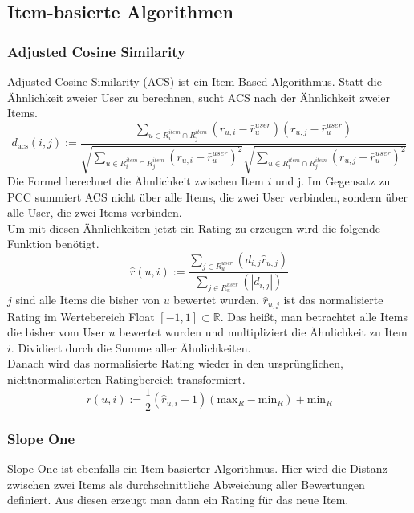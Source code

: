 \subsection{Item-basierte Algorithmen}
\subsubsection{Adjusted Cosine Similarity}\label{s.adjcos}
Adjusted Cosine Similarity (ACS) ist ein Item-Based-Algorithmus. Statt die Ähnlichkeit zweier User zu berechnen, sucht ACS nach der Ähnlichkeit zweier Items.
\begin{equation}
 d_{\mathrm{acs}}(i,j) := \dfrac{\sum\limits_{u\in R^{item}_{i} \cap R^{item}_{j}} (r_{u,i}-\bar{r}^{user}_{u})(r_{u,j}-\bar{r}^{user}_{u})}  {\sqrt{\sum\limits_{u\in R^{item}_{i} \cap R^{item}_{j}}(r_{u,i}-\bar{r}^{user}_{u})^2}\sqrt{\sum\limits_{u\in R^{item}_{i} \cap R^{item}_{j}}(r_{u,j}-\bar{r}^{user}_{u})^2}} 	\label{adjcosformula1}
\end{equation}
Die Formel berechnet die Ähnlichkeit zwischen Item $i$ und j. Im Gegensatz zu PCC summiert ACS nicht über alle Items, die zwei User verbinden, sondern über alle User, die zwei Items verbinden.\\
Um mit diesen Ähnlichkeiten jetzt ein Rating zu erzeugen wird die folgende Funktion benötigt.
\begin{equation}
 \hat{r}(u,i) := \dfrac{\sum\limits_{j\in R^{user}_{u}} (d_{i,j} \hat{r}_{u,j})}  {\sum\limits_{j\in R^{user}_{u}} (|d_{i,j}|)} 	\label{adjcosformula2}
\end{equation}	
$j$ sind alle Items die bisher von $u$ bewertet wurden. $\hat{r}_{u,j}$ ist das normalisierte Rating im Wertebereich Float $[-1,1]\subset \mathbb{R}$. Das heißt, man betrachtet alle Items die bisher vom User $u$ bewertet wurden und multipliziert die Ähnlichkeit zu Item $i$. Dividiert durch die Summe aller Ähnlichkeiten.\\
Danach wird das normalisierte Rating wieder in den ursprünglichen, nichtnormalisierten Ratingbereich transformiert.
\begin{equation}
{r}(u,i) := \dfrac{1}{2}(\hat{r}_{u,i}+1)(\mathrm{max}_{R}-\mathrm{min}_{R})+\mathrm{min}_{R} 	\label{adjcosformula3}
\end{equation}	

\subsubsection{Slope One}\label{s.slopeone}
Slope One ist ebenfalls ein Item-basierter Algorithmus. Hier wird die Distanz zwischen zwei Items als durchschnittliche Abweichung aller Bewertungen definiert. Aus diesen erzeugt man dann ein Rating für das neue Item.
 
